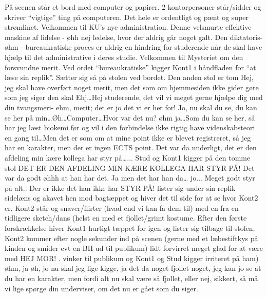 \documentclass[a4paper,11pt]{article}
\begin{document}
\begin{sketch}
\scene På scenen står et bord med computer og papirer. 2 kontorpersoner står/sidder og skriver ``vigtige'' ting på computeren. Det hele er ordentligt og pænt og super strømlinet.
 Velkommen til KU’s nye administration. Denne velsmurte effektive maskine af lidelse - øhh nej ledelse, hvor der aldrig går noget galt. Den diktatoris- øhm - bureaukratiske proces er aldrig en hindring for studerende når de skal have hjælp til det administrative i deres studie. Velkommen til Mysteriet om den forsvundne merit. 
\act Ved ordet ``bureaukratiske'' kigger Kont1 i håndfladen for ``at læse sin replik''. Sætter sig så på stolen ved bordet. Den anden stol er tom
 Hej, jeg skal have overført noget merit, men det som om hjemmesiden ikke gider gøre som jeg siger den skal
 Ehj\ldots Hej studerende, det vil vi meget gerne hjælpe dig med din tvangsmeri- ehm, merit; det er jo det vi er her for!
 Jo, nu skal du se, du kan se her på min\ldots Øh\ldots Computer\ldots Hvor var det nu?
 øhm ja\ldots Som du kan se her, så har jeg læst biokemi før og vil i den forbindelse ikke rigtig have videnskabsteori en gang til\ldots Men det er som om at mine point ikke er blevet registreret, så jeg har en karakter, men der er ingen ECTS point.
 Det var da underligt, det er den afdeling min kære kollega har styr på…...
\act Stud og Kont1 kigger på den tomme stol
 DET ER DEN AFDELING MIN KÆRE KOLLEGA HAR STYR PÅ!
 Det var da godt øhhh at han har det.
 Ja men det har han da… jo... Meget godt styr på alt.. Der er ikke det han ikke har STYR PÅ!
 lister sig under sin replik sidelæns og akavet hen mod bagtæppet og hiver det til side for at se hvor Kont2 er. Kont2 står og snaver/flirter (hvad end vi kan få dem til) med en fra en tidligere sketch/dans (helst en med et fjollet/grimt kostume. Efter den første forskrækkelse hiver Kont1 hurtigt tæppet for igen og lister sig tilbage til stolen. Kont2 kommer efter nogle sekunder ind på scenen (gerne med et læbestiftkys på kinden og smider evt en BH ud til publikum) lidt forvirret meget glad for at være med
 HEJ MOR! .
 vinker til publikum og Kont1 og Stud kigger irriteret på ham)
 øhm, ja øh, jo nu skal jeg lige kigge, ja det da noget fjollet noget, jeg kan jo se at du har en karakter, men fordi alt nu skal være så fjollet, eller nej, sikkert, så må vi lige spørge din underviser, om det nu er gået som du siger.

\end{sketch}
\end{document}
